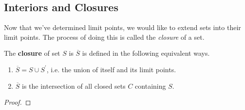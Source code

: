 \subsection{Interiors and Closures}

  Now that we've determined limit points, we would like to extend sets into their limit points. The process of doing this is called the \textit{closure} of a set. 

  \begin{definition}[Closure]
    The \textbf{closure} of set $S$ is $\overline{S}$ is defined in the following equivalent ways. 
    \begin{enumerate}
      \item $\overline{S} = S \cup S^\prime$, i.e. the union of itself and its limit points. 
      \item $\overline{S}$ is the intersection of all closed sets $C$ containing $S$. 
    \end{enumerate}
  \end{definition}
  \begin{proof}
    
  \end{proof}

